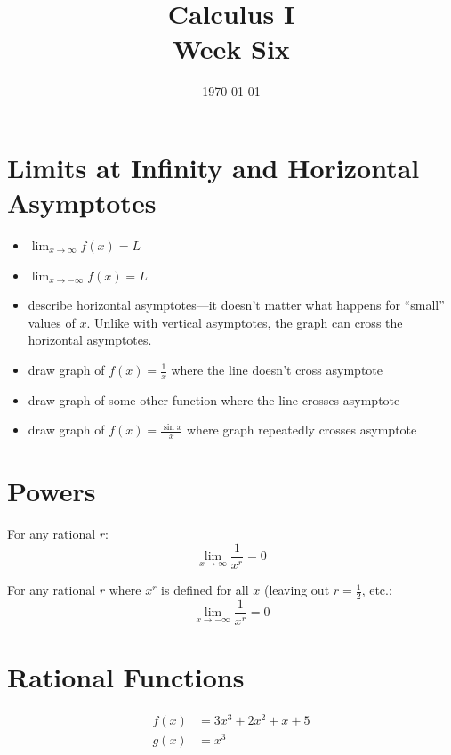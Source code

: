 \documentclass[letterpaper, landscape]{exam}
\author{}
\date{\today}
\title{Calculus I \\ Week Six}
\begin{document}
  \maketitle
  \tableofcontents

  \section{Limits at Infinity and Horizontal Asymptotes} 

  \begin{itemize}
    \item $\lim_{x \to \infty} f(x) = L$ 
    \item $\lim_{x \to -\infty} f(x) = L$ 
    \item describe horizontal asymptotes---it doesn't matter what happens for ``small''
      values of $x$. Unlike with vertical asymptotes, the graph can cross the horizontal
      asymptotes.

    \item draw graph of $f(x) = \frac{1}{x}$ where the line doesn't cross asymptote

    \item draw graph of some other function where the line crosses asymptote

    \item draw graph of $f(x) = \frac{\sin x}{x}$ where graph repeatedly crosses asymptote

  \end{itemize}

  \section{Powers}

  For any rational $r$:
  \[
    \lim_{x \to \infty} \frac{1}{x^r} = 0
  \]

  For any rational $r$ where $x^r$ is defined for all $x$ (leaving out $r =
  \frac{1}2$, etc.:
  \[
    \lim_{x \to -\infty} \frac{1}{x^r} = 0
  \]

  \section{Rational Functions}

  \begin{align*}
    f(x) &= 3x^3 + 2x^2 + x + 5 \\
    g(x) &= x^3 \\
  \end{align*}
\end{document}

